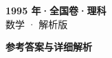 \documentclass[zihao=-4, a4paper]{ctexart}
\begin{document}
\begin{center}
  {\Large\bfseries 1995 年·全国卷·理科}\\[4pt]
  {\large 数学 · 解析版}
\end{center}
\medskip
{}

\clearpage
{}
\begin{center}{\Large\bfseries 参考答案与详细解析}\end{center}
\medskip

\end{document}
